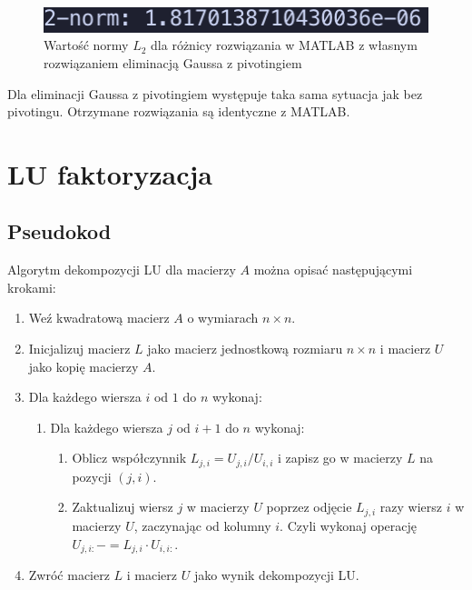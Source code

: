 \documentclass{article}
\begin{document}
\begin{figure}[H]
    \centering
    \includegraphics[width=\linewidth]{2norm2.png}
    \caption{Wartość normy $L_2$ dla różnicy rozwiązania w MATLAB z własnym rozwiązaniem eliminacją Gaussa z pivotingiem}
    \label{fig:2norm2}
\end{figure}

Dla eliminacji Gaussa z pivotingiem występuje taka sama sytuacja jak bez pivotingu. Otrzymane rozwiązania są identyczne z MATLAB.

\section{LU faktoryzacja}

\subsection{Pseudokod}

Algorytm dekompozycji LU dla macierzy $A$ można opisać następującymi krokami:

\begin{enumerate}
    \item Weź kwadratową macierz $A$ o wymiarach $n \times n$.
    \item Inicjalizuj macierz $L$ jako macierz jednostkową rozmiaru $n \times n$ i macierz $U$ jako kopię macierzy $A$.
    \item Dla każdego wiersza $i$ od $1$ do $n$ wykonaj:
    \begin{enumerate}
        \item Dla każdego wiersza $j$ od $i+1$ do $n$ wykonaj:
        \begin{enumerate}
            \item Oblicz współczynnik $L_{j,i} = U_{j,i} / U_{i,i}$ i zapisz go w macierzy $L$ na pozycji $(j,i)$.
            \item Zaktualizuj wiersz $j$ w macierzy $U$ poprzez odjęcie $L_{j,i}$ razy wiersz $i$ w macierzy $U$, zaczynając od kolumny $i$. Czyli wykonaj operację $U_{j,i:} -= L_{j,i} \cdot U_{i,i:}$.
        \end{enumerate}
    \end{enumerate}
    \item Zwróć macierz $L$ i macierz $U$ jako wynik dekompozycji LU.
\end{enumerate}
\end{document}
